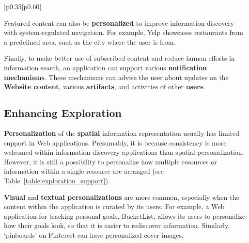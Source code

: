 {{\begin{table}[ht!]
\begin{tabular}{{|p{0.35\linewidth}|p{0.60\linewidth}|}}
\end{tabular}
\end{table}
\clearpage

Featured content can also be \textbf{personalized} to improve information discovery with system-regulated navigation. For example, Yelp showcases restaurants from a predefined area, such as the city where the user is from.

Finally, to make better use of subscribed content and reduce human efforts in information search, an application can support various \textbf{notification mechanisms}. These mechanisms can advise the user about updates on the \textbf{Website content}, various \textbf{artifacts}, and activities of other \textbf{users}.  

} %
{\subsection{Enhancing Exploration}
\textbf{Personalization} of the \textbf{spatial} information representation usually has limited support in Web applications. Presumably, it is because consistency is more welcomed within information discovery applications than spatial personalization. However, it is still a possibility to personalize how multiple resources or information within a single resource are arranged (see Table~\ref{table:exploration_support}). 

\textbf{Visual} and \textbf{textual personalizations} are more common, especially when the content within the application is curated by its users.  For example, a Web application for tracking personal goals, BucketList, allows its users to personalize how their goals look, so that it is easier to rediscover information. Similarly, `pinboards' on Pinterest can have personalized cover images.

}}

